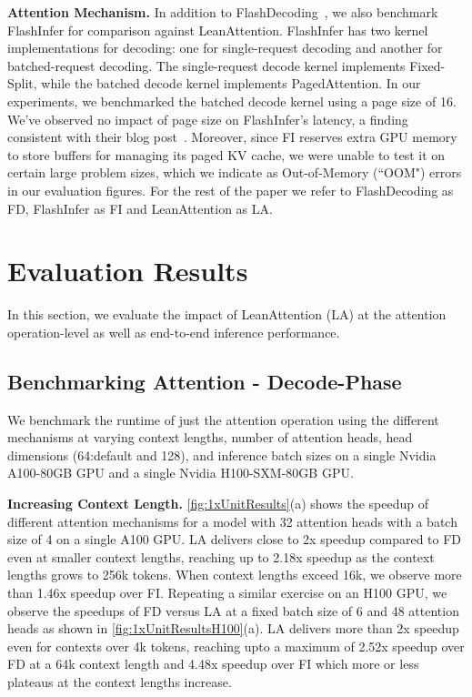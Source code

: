 {{{\textbf{Attention Mechanism.} In addition to FlashDecoding~\cite{flashdecoding}, we also benchmark FlashInfer for comparison against LeanAttention. FlashInfer has two kernel implementations for decoding: one for single-request decoding and another for batched-request decoding. The single-request decode kernel implements Fixed-Split, while the batched decode kernel implements PagedAttention. In our experiments, we benchmarked the batched decode kernel using a page size of 16. We've observed no impact of page size on FlashInfer’s latency, a finding consistent with their blog post~\cite{flashinfer}. Moreover, since FI reserves extra GPU memory to store buffers for managing its paged KV cache, we were unable to test it on certain large problem sizes, which we indicate as Out-of-Memory (``OOM") errors in our evaluation figures. For the rest of the paper we refer to FlashDecoding as FD, FlashInfer as FI and LeanAttention as LA.

\section{Evaluation Results}
\label{sec:evalresults}
In this section, we evaluate the impact of LeanAttention (LA) at the attention operation-level as well as end-to-end inference performance.

\subsection{Benchmarking Attention - Decode-Phase}
\label{subsec:attenperf}

We benchmark the runtime of just the attention operation using the different mechanisms at varying context lengths, number of attention heads, head dimensions (64:default and 128), and inference batch sizes on a single Nvidia A100-80GB GPU and a single Nvidia H100-SXM-80GB GPU.

{\textbf{Increasing Context Length.} \autoref{fig:1xUnitResults}(a) shows the speedup of different attention mechanisms for a model with 32 attention heads with a  batch size of 4 on a single A100 GPU. LA delivers close to 2x speedup compared to FD even at smaller context lengths, reaching up to 2.18x speedup as the context lengths grows to 256k tokens. When context lengths exceed 16k, we observe more than 1.46x speedup over FI. Repeating a similar exercise on an H100 GPU, we observe the speedups of FD versus LA at a fixed batch size of 6 and 48 attention heads as shown in \autoref{fig:1xUnitResultsH100}(a). LA delivers more than 2x speedup even for contexts over 4k tokens, reaching upto a maximum of 2.52x speedup over FD at a 64k context length and 4.48x speedup over FI which more or less plateaus at the context lengths increase.

}}}}
